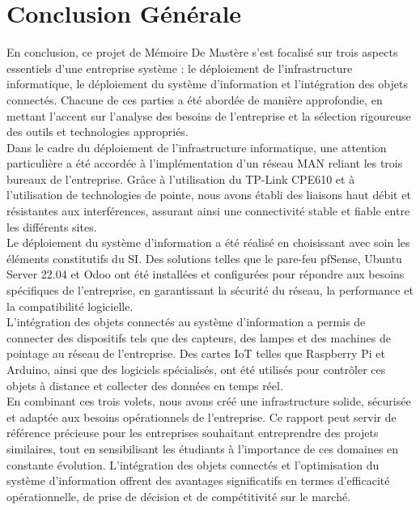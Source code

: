 \chapter*{Conclusion Générale}



En conclusion, ce projet de Mémoire De Mastère s'est focalisé sur trois aspects essentiels d'une entreprise système : le déploiement de l'infrastructure informatique, le déploiement du système d'information et l'intégration des objets connectés. Chacune de ces parties a été abordée de manière approfondie, en mettant l'accent sur l'analyse des besoins de l'entreprise et la sélection rigoureuse des outils et technologies appropriés. \\

Dans le cadre du déploiement de l'infrastructure informatique, une attention particulière a été accordée à l'implémentation d'un réseau MAN reliant les trois bureaux de l'entreprise. Grâce à l'utilisation du TP-Link CPE610 et à l'utilisation de technologies de pointe, nous avons établi des liaisons haut débit et résistantes aux interférences, assurant ainsi une connectivité stable et fiable entre les différents sites. \\

Le déploiement du système d'information a été réalisé en choisissant avec soin les éléments constitutifs du SI. Des solutions telles que le pare-feu pfSense, Ubuntu Server 22.04 et Odoo ont été installées et configurées pour répondre aux besoins spécifiques de l'entreprise, en garantissant la sécurité du réseau, la performance et la compatibilité logicielle. \\

L'intégration des objets connectés au système d'information a permis de connecter des dispositifs tels que des capteurs, des lampes et des machines de pointage au réseau de l'entreprise. Des cartes IoT telles que Raspberry Pi et Arduino, ainsi que des logiciels spécialisés, ont été utilisés pour contrôler ces objets à distance et collecter des données en temps réel. \\

En combinant ces trois volets, nous avons créé une infrastructure solide, sécurisée et adaptée aux besoins opérationnels de l'entreprise. Ce rapport peut servir de référence précieuse pour les entreprises souhaitant entreprendre des projets similaires, tout en sensibilisant les étudiants à l'importance de ces domaines en constante évolution. L'intégration des objets connectés et l'optimisation du système d'information offrent des avantages significatifs en termes d'efficacité opérationnelle, de prise de décision et de compétitivité sur le marché. \\